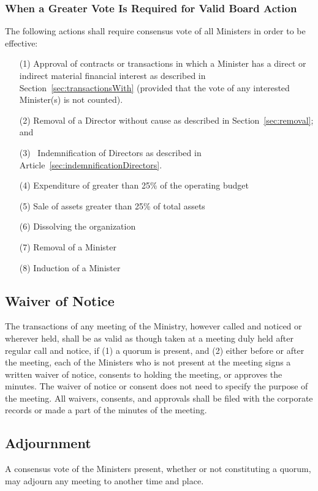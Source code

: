 \documentclass[letterpaper,titlepage]{article}
\begin{document}
\subsubsection{When a Greater Vote Is Required for Valid Board Action}
\label{sec:whenGreater}
The following actions shall require consensus vote of all Ministers in order to be effective:
\begin{itemize}
    \item[(1)] Approval of contracts or transactions in which a Minister has a
        direct or indirect material financial interest as described in
        Section~\ref{sec:transactionsWith} (provided that the vote of any interested Minister(s) is not
        counted).
    \item[(2)] Removal of a Director without cause as described in
        Section~\ref{sec:removal}; and  
    \item[(3)] Indemnification of Directors as described in
        Article~\ref{sec:indemnificationDirectors}. 
    \item[(4)] Expenditure of greater than 25\% of the operating budget
    \item[(5)] Sale of assets greater than 25\% of total assets
    \item[(6)] Dissolving the organization
    \item[(7)] Removal of a Minister
    \item[(8)] Induction of a Minister
\end{itemize}
\subsection{Waiver of Notice}
\label{sec:waiverNotice}
The transactions of any meeting of the Ministry, however called and noticed or wherever held, shall be as valid as though taken at a meeting duly held after regular call and notice, if (1) a quorum is present, and (2) either before or after the meeting, each of the Ministers who is not present at the meeting signs a written waiver of notice, consents to holding the meeting, or approves the minutes. The waiver of notice or consent does not need to specify the purpose of the meeting. All waivers, consents, and approvals shall be filed with the corporate records or made a part of the minutes of the meeting.
\subsection{Adjournment}
\label{sec:adjournment}
A consensus vote of the Ministers present, whether or not constituting a quorum, may adjourn any meeting to another time and place.
\end{document}
